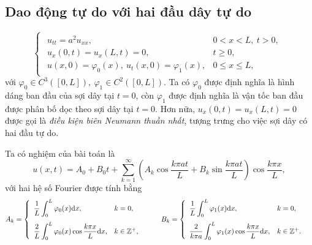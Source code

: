 \documentclass[10pt, a4paper]{article}
\begin{document}
	\subsection{Dao động tự do với hai đầu dây tự do}
	\vspace{2mm}
	\begin{tcolorbox}[enhanced,colback=blue!5!white,colframe=blue!75!black,sharp corners=all,shadow={0mm}{0mm}{-1.5mm}%
		{fill=blue!75!red,opacity=0.3},title=\textbf{Dạng của bài toán}]
		$$\begin{cases}
			\begin{array}{ll}
				u_{tt}=a^2u_{xx}, & 0<x<L,~t>0,\\
				u_x(0,t)=u_x(L,t)=0, & t\ge0,\\
				u(x,0)=\varphi_0(x),~u_t(x,0)=\varphi_1(x), & 0\le x\le L,
			\end{array}
		\end{cases}$$
		với $\varphi_0\in C^3([0,L]),~\varphi_1\in C^2([0,L])$.\vskip7pt
		\quad Ta có $\varphi_0$ được định nghĩa là hình dáng ban đầu của sợi dây tại $t=0$, còn $\varphi_1$ được định nghĩa là vận tốc ban đầu được phân bố dọc theo sợi dây tại $t=0$.\vskip7pt
		\quad Hơn nữa, $u_x(0,t)=u_x(L,t)=0$ được gọi là \textit{điều kiện biên Neumann thuần nhất}, tượng trưng cho việc sợi dây có hai đầu tự do.
	\end{tcolorbox}
	\vspace{2mm}
	Ta có nghiệm của bài toán là $$u(x,t)=A_0+B_0t+\displaystyle\sum_{k=1}^\infty\left(A_k\cos\dfrac{k\pi at}{L}+B_k\sin\dfrac{k\pi at}{L}\right)\cos\dfrac{k\pi x}{L},$$
	với hai hệ số Fourier được tính bằng $$A_k=\begin{cases}
		\begin{array}{ll}
			\dfrac1L\displaystyle\int_0^L\varphi_0(x)\text{d}x, & k=0, \\
			\noalign{\vskip7pt}
			\dfrac2L\displaystyle\int_0^L\varphi_0(x)\cos\dfrac{k\pi x}{L}\text{d}x, & k\in\mathbb Z^+,
		\end{array}
	\end{cases}\hspace{0.5cm}B_k=\begin{cases}
		\begin{array}{ll}
			\dfrac1L\displaystyle\int_0^L\varphi_1(x)\text{d}x, & k=0, \\
			\noalign{\vskip7pt}
			\dfrac2{k\pi a}\displaystyle\int_0^L\varphi_1(x)\cos\dfrac{k\pi x}{L}\text{d}x, & k\in\mathbb Z^+.
		\end{array}
	\end{cases}$$
	
\end{document}
